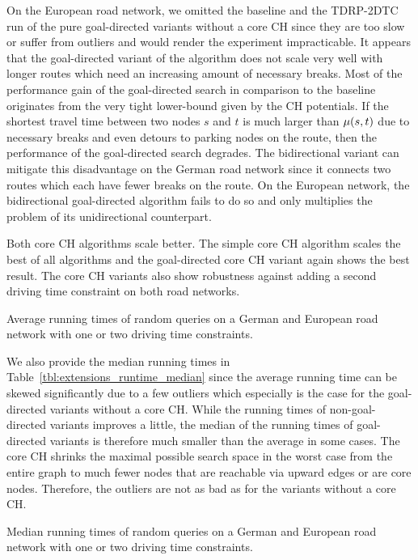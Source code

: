 On the European road network, we omitted the baseline and the TDRP-2DTC run of the pure goal-directed variants without a core CH since they are too slow or suffer from outliers and would render the experiment impracticable. It appears that the goal-directed variant of the algorithm does not scale very well with longer routes which need an increasing amount of necessary breaks. Most of the performance gain of the goal-directed search in comparison to the baseline originates from the very tight lower-bound given by the CH potentials. If the shortest travel time between two nodes $s$ and $t$ is much larger than $\mu(s,t)$ due to necessary breaks and even detours to parking nodes on the route, then the performance of the goal-directed search degrades. The bidirectional variant can mitigate this disadvantage on the German road network since it connects two routes which each have fewer breaks on the route. On the European network, the bidirectional goal-directed algorithm fails to do so and only multiplies the problem of its unidirectional counterpart.

Both core CH algorithms scale better. The simple core CH algorithm scales the best of all algorithms and the goal-directed core CH variant again shows the best result. The core CH variants also show robustness against adding a second driving time constraint on both road networks.

\begin{table}[hbtp]
	\centering
	
	\caption{Average running times of random queries on a German and European road network with one or two driving time constraints.}
	\label{tbl:extensions_runtime}
\end{table}

We also provide the median running times in Table~\ref{tbl:extensions_runtime_median} since the average running time can be skewed significantly due to a few outliers which especially is the case for the goal-directed variants without a core CH. While the running times of non-goal-directed variants improves a little, the median of the running times of goal-directed variants is therefore much smaller than the average in some cases. The core CH shrinks the maximal possible search space in the worst case from the entire graph to much fewer nodes that are reachable via upward edges or are core nodes. Therefore, the outliers are not as bad as for the variants without a core CH.

\begin{table}[hbtp]
	\centering
	
	\caption{Median running times of random queries on a German and European road network with one or two driving time constraints.}
	\label{tbl:extensions_runtime_median}
\end{table}

